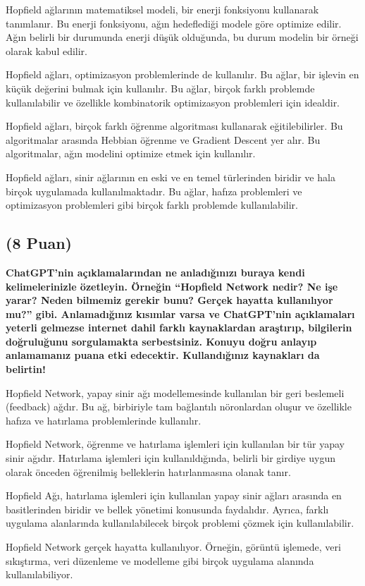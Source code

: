 \documentclass[11pt]{article}
\begin{document}
Hopfield ağlarının matematiksel modeli, bir enerji fonksiyonu kullanarak tanımlanır. Bu enerji fonksiyonu, ağın hedeflediği modele göre optimize edilir. Ağın belirli bir durumunda enerji düşük olduğunda, bu durum modelin bir örneği olarak kabul edilir.

Hopfield ağları, optimizasyon problemlerinde de kullanılır. Bu ağlar, bir işlevin en küçük değerini bulmak için kullanılır. Bu ağlar, birçok farklı problemde kullanılabilir ve özellikle kombinatorik optimizasyon problemleri için idealdir.

Hopfield ağları, birçok farklı öğrenme algoritması kullanarak eğitilebilirler. Bu algoritmalar arasında Hebbian öğrenme ve Gradient Descent yer alır. Bu algoritmalar, ağın modelini optimize etmek için kullanılır.

Hopfield ağları, sinir ağlarının en eski ve en temel türlerinden biridir ve hala birçok uygulamada kullanılmaktadır. Bu ağlar, hafıza problemleri ve optimizasyon problemleri gibi birçok farklı problemde kullanılabilir.

\subsection{(8 Puan)} \textbf{ChatGPT’nin açıklamalarından ne anladığınızı buraya kendi kelimelerinizle özetleyin. Örneğin ``Hopfield Network nedir? Ne işe yarar? Neden bilmemiz gerekir bunu? Gerçek hayatta kullanılıyor mu?'' gibi. Anlamadığınız kısımlar varsa ve ChatGPT’nin açıklamaları yeterli gelmezse internet dahil farklı kaynaklardan araştırıp, bilgilerin doğruluğunu sorgulamakta serbestsiniz. Konuyu doğru anlayıp anlamamanız puana etki edecektir. Kullandığınız kaynakları da belirtin!}

Hopfield Network, yapay sinir ağı modellemesinde kullanılan bir geri beslemeli (feedback) ağdır. Bu ağ, birbiriyle tam bağlantılı nöronlardan oluşur ve özellikle hafıza ve hatırlama problemlerinde kullanılır.

Hopfield Network, öğrenme ve hatırlama işlemleri için kullanılan bir tür yapay sinir ağıdır. Hatırlama işlemleri için kullanıldığında, belirli bir girdiye uygun olarak önceden öğrenilmiş belleklerin hatırlanmasına olanak tanır.

Hopfield Ağı, hatırlama işlemleri için kullanılan yapay sinir ağları arasında en basitlerinden biridir ve bellek yönetimi konusunda faydalıdır. Ayrıca, farklı uygulama alanlarında kullanılabilecek birçok problemi çözmek için kullanılabilir.

Hopfield Network gerçek hayatta kullanılıyor. Örneğin, görüntü işlemede, veri sıkıştırma, veri düzenleme ve modelleme gibi birçok uygulama alanında kullanılabiliyor.
\end{document}
